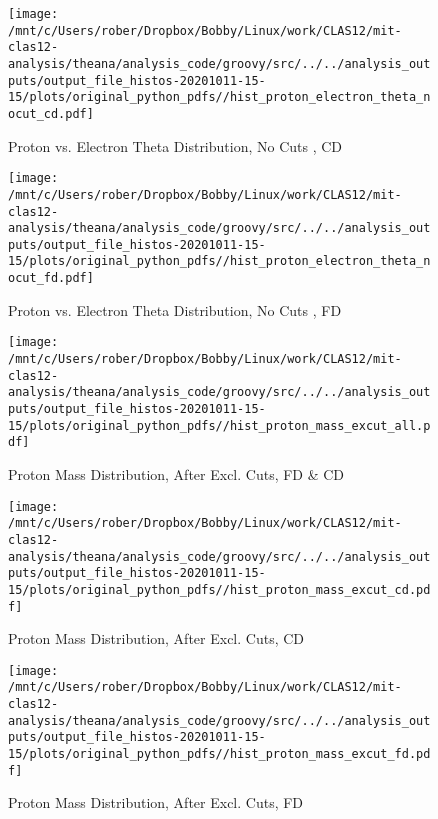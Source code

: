 \documentclass{article}
\begin{document}
\begin{landscape}
\begin{figure}[h]
        \texttt{[image: /mnt/c/Users/rober/Dropbox/Bobby/Linux/work/CLAS12/mit-clas12-analysis/theana/analysis\_code/groovy/src/../../analysis\_outputs/output\_file\_histos-20201011-15-15/plots/original\_python\_pdfs//hist\_proton\_electron\_theta\_nocut\_cd.pdf]}
        \captionsetup{textformat=empty,labelformat=blank}
        \caption{Proton vs. Electron Theta Distribution, No Cuts , CD}
    \end{figure}
    \clearpage
    
    \begin{figure}[h]
        \centering

        \texttt{[image: /mnt/c/Users/rober/Dropbox/Bobby/Linux/work/CLAS12/mit-clas12-analysis/theana/analysis\_code/groovy/src/../../analysis\_outputs/output\_file\_histos-20201011-15-15/plots/original\_python\_pdfs//hist\_proton\_electron\_theta\_nocut\_fd.pdf]}
        \captionsetup{textformat=empty,labelformat=blank}
        \caption{Proton vs. Electron Theta Distribution, No Cuts , FD}
    \end{figure}
    \clearpage
    
    \begin{figure}[h]
        \centering

        \texttt{[image: /mnt/c/Users/rober/Dropbox/Bobby/Linux/work/CLAS12/mit-clas12-analysis/theana/analysis\_code/groovy/src/../../analysis\_outputs/output\_file\_histos-20201011-15-15/plots/original\_python\_pdfs//hist\_proton\_mass\_excut\_all.pdf]}
        \captionsetup{textformat=empty,labelformat=blank}
        \caption{Proton Mass Distribution, After Excl. Cuts, FD \& CD}
    \end{figure}
    \clearpage
    
    \begin{figure}[h]
        \centering

        \texttt{[image: /mnt/c/Users/rober/Dropbox/Bobby/Linux/work/CLAS12/mit-clas12-analysis/theana/analysis\_code/groovy/src/../../analysis\_outputs/output\_file\_histos-20201011-15-15/plots/original\_python\_pdfs//hist\_proton\_mass\_excut\_cd.pdf]}
        \captionsetup{textformat=empty,labelformat=blank}
        \caption{Proton Mass Distribution, After Excl. Cuts, CD}
    \end{figure}
    \clearpage
    
    \begin{figure}[h]
        \centering

        \texttt{[image: /mnt/c/Users/rober/Dropbox/Bobby/Linux/work/CLAS12/mit-clas12-analysis/theana/analysis\_code/groovy/src/../../analysis\_outputs/output\_file\_histos-20201011-15-15/plots/original\_python\_pdfs//hist\_proton\_mass\_excut\_fd.pdf]}
        \captionsetup{textformat=empty,labelformat=blank}
        \caption{Proton Mass Distribution, After Excl. Cuts, FD}
    \end{figure}
    \clearpage
    

\end{landscape}
\end{document}
